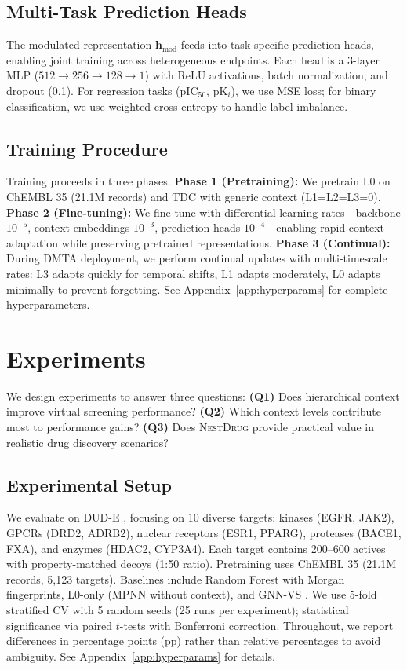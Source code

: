 \documentclass[runningheads]{llncs}
\newcommand{\methodname}{\textsc{NestDrug}}
\newcommand{\hmod}{\mathbf{h}_{\text{mod}}}
\begin{document}
\subsection{Multi-Task Prediction Heads}

The modulated representation $\hmod$ feeds into task-specific prediction heads, enabling joint training across heterogeneous endpoints. Each head is a 3-layer MLP ($512 \rightarrow 256 \rightarrow 128 \rightarrow 1$) with ReLU activations, batch normalization, and dropout (0.1). For regression tasks (pIC$_{50}$, pK$_i$), we use MSE loss; for binary classification, we use weighted cross-entropy to handle label imbalance.

\subsection{Training Procedure}

Training proceeds in three phases. \textbf{Phase 1 (Pretraining):} We pretrain L0 on ChEMBL 35 \cite{zdrazil_2024_chembl} (21.1M records) and TDC \cite{huang_2021_tdc} with generic context (L1=L2=L3=0). \textbf{Phase 2 (Fine-tuning):} We fine-tune with differential learning rates---backbone $10^{-5}$, context embeddings $10^{-3}$, prediction heads $10^{-4}$---enabling rapid context adaptation while preserving pretrained representations. \textbf{Phase 3 (Continual):} During DMTA deployment, we perform continual updates with multi-timescale rates: L3 adapts quickly for temporal shifts, L1 adapts moderately, L0 adapts minimally to prevent forgetting. See Appendix~\ref{app:hyperparams} for complete hyperparameters.

\section{Experiments}
\label{sec:experiments}

We design experiments to answer three questions: \textbf{(Q1)} Does hierarchical context improve virtual screening performance? \textbf{(Q2)} Which context levels contribute most to performance gains? \textbf{(Q3)} Does \methodname{} provide practical value in realistic drug discovery scenarios?

\subsection{Experimental Setup}

We evaluate on DUD-E \cite{mysinger_2012_dude}, focusing on 10 diverse targets: kinases (EGFR, JAK2), GPCRs (DRD2, ADRB2), nuclear receptors (ESR1, PPARG), proteases (BACE1, FXA), and enzymes (HDAC2, CYP3A4). Each target contains 200--600 actives with property-matched decoys (1:50 ratio). Pretraining uses ChEMBL 35 \cite{zdrazil_2024_chembl} (21.1M records, 5,123 targets). Baselines include Random Forest with Morgan fingerprints, L0-only (MPNN without context), and GNN-VS \cite{lim_2019_gnn_vs}. We use 5-fold stratified CV with 5 random seeds (25 runs per experiment); statistical significance via paired $t$-tests with Bonferroni correction. Throughout, we report differences in percentage points (pp) rather than relative percentages to avoid ambiguity. See Appendix~\ref{app:hyperparams} for details.
\end{document}

